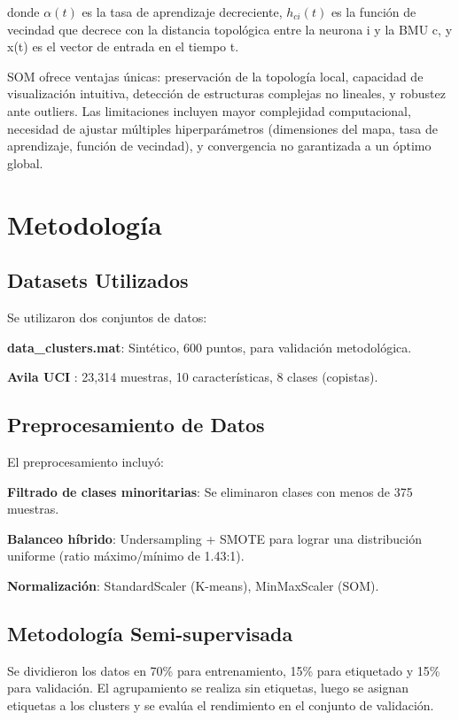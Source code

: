 \documentclass[12pt,a4paper]{article}
\begin{document}
donde $\alpha(t)$ es la tasa de aprendizaje decreciente, $h_{ci}(t)$ es la función de vecindad que decrece con la distancia topológica entre la neurona i y la BMU c, y x(t) es el vector de entrada en el tiempo t.

SOM ofrece ventajas únicas: preservación de la topología local, capacidad de visualización intuitiva, detección de estructuras complejas no lineales, y robustez ante outliers. Las limitaciones incluyen mayor complejidad computacional, necesidad de ajustar múltiples hiperparámetros (dimensiones del mapa, tasa de aprendizaje, función de vecindad), y convergencia no garantizada a un óptimo global.

\section{Metodología}

\subsection{Datasets Utilizados}

Se utilizaron dos conjuntos de datos:

\textbf{data\_clusters.mat}: Sintético, 600 puntos, para validación metodológica.

\textbf{Avila UCI} \cite{dua2019}: 23,314 muestras, 10 características, 8 clases (copistas).

\subsection{Preprocesamiento de Datos}

El preprocesamiento incluyó:

\textbf{Filtrado de clases minoritarias}: Se eliminaron clases con menos de 375 muestras.

\textbf{Balanceo híbrido}: Undersampling + SMOTE \cite{chawla2002} para lograr una distribución uniforme (ratio máximo/mínimo de 1.43:1).

\textbf{Normalización}: StandardScaler (K-means), MinMaxScaler (SOM).

\subsection{Metodología Semi-supervisada}

Se dividieron los datos en 70\% para entrenamiento, 15\% para etiquetado y 15\% para validación. El agrupamiento se realiza sin etiquetas, luego se asignan etiquetas a los clusters y se evalúa el rendimiento en el conjunto de validación.
\end{document}
